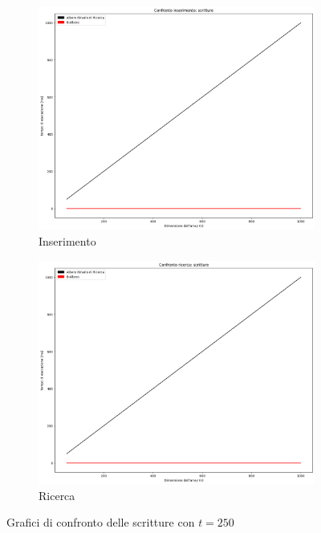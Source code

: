 \begin{figure}[H]
    \centering
    \begin{subfigure}[b]{0.49\textwidth}
        \centering
        \includegraphics[width=\textwidth]{comparison-graphs/insert-w-t250.png}
        \caption{Inserimento}
        \label{fig:compgraphinsertwrite250}
    \end{subfigure}
    \hfill
    \begin{subfigure}[b]{0.49\textwidth}
        \centering
        \includegraphics[width=\textwidth]{comparison-graphs/search-w-t250.png}
        \caption{Ricerca}
        \label{fig:compgraphsearchwrite250}
    \end{subfigure}
    \caption{Grafici di confronto delle scritture con $t=250$}
    \label{fig:compgraphread250}
\end{figure}


